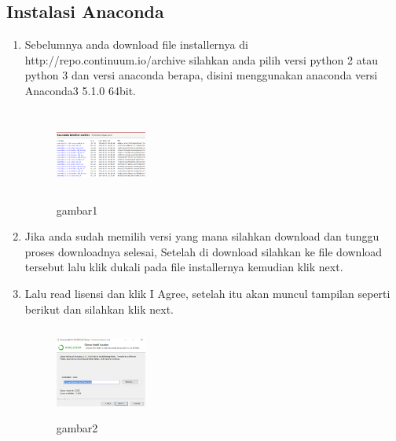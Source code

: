 \subsection{Instalasi Anaconda}
\begin{enumerate}
    \item Sebelumnya anda download file installernya di http://repo.continuum.io/archive silahkan anda pilih versi python 2 atau python 3 dan versi anaconda berapa, disini menggunakan anaconda versi Anaconda3 5.1.0 64bit.
    \begin{figure}[!htbp]
        \centering
        \includegraphics[width=3cm,height=3cm]{figures/choi/1.png}
        \caption{gambar1}
        \label{gambar pertama}
        \end{figure}

    \item Jika anda sudah memilih versi yang mana silahkan download dan tunggu proses downloadnya selesai, Setelah di download silahkan ke file download tersebut lalu klik dukali pada file installernya kemudian klik next.
    \item Lalu read lisensi dan klik I Agree, setelah itu akan muncul tampilan seperti berikut dan silahkan klik next.
    \begin{figure}[!htbp]
        \centering
        \includegraphics[width=3cm,height=3cm]{figures/choi/2.png}
        \caption{gambar2}
        \label{gambar kedua}
        \end{figure}


\end{enumerate}
